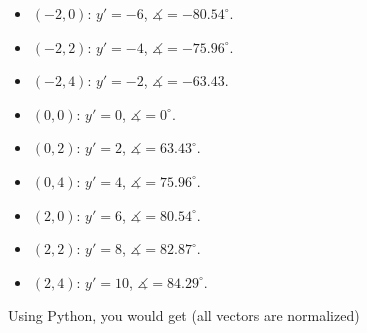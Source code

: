 \documentclass[12pt]{article}
\begin{document}
\begin{itemize}
\begin{multicols}{2}
	\begin{itemize}
		\item $(-2, 0)$: $y' = -6$, $\measuredangle = -80.54^\circ$.
		\item $(-2, 2)$: $y' = -4$, $\measuredangle = -75.96^\circ$. 
		\item $(-2, 4)$: $y' = -2$, $\measuredangle = -63.43$.
		\item $(0, 0)$: $y' = 0$, $\measuredangle = 0^{\circ}$.
		\item $(0, 2)$: $y' = 2$, $\measuredangle = 63.43^\circ$.
		\item $(0, 4)$: $y' = 4$, $\measuredangle = 75.96^\circ$.
		\item $(2, 0)$: $y' = 6$, $\measuredangle = 80.54^\circ$.
		\item $(2, 2)$: $y' = 8$, $\measuredangle = 82.87^\circ$.
		\item $(2, 4)$: $y' = 10$, $\measuredangle = 84.29^\circ$.
		\end{itemize}
	\end{multicols}
	\end{itemize}
	
	\newpage
	
	Using Python, you would get (all vectors are normalized)
	
	\vspace*{16pt}
	
\end{document}
